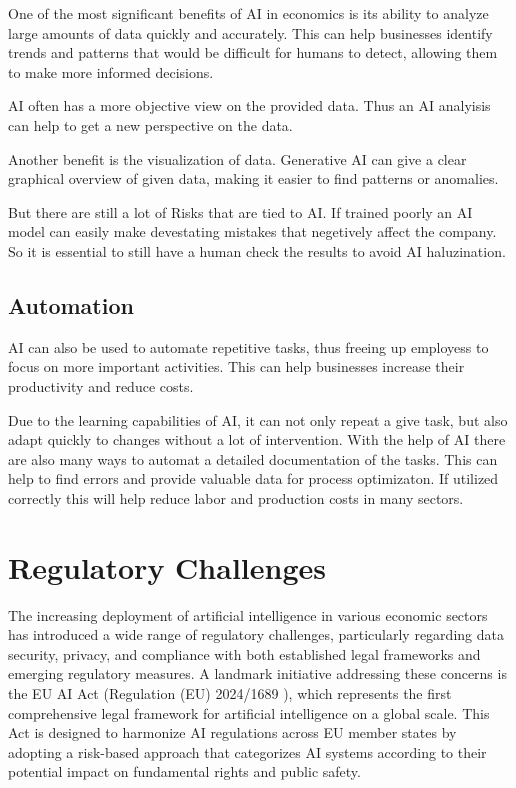 One of the most significant benefits of AI in economics is its ability to analyze large amounts of data quickly and accurately. 
This can help businesses identify trends and patterns that would be difficult for humans to detect, allowing them to make more informed decisions.

AI often has a more objective view on the provided data. Thus an AI analyisis can help to get a new perspective on the data. 

Another benefit is the visualization of data. Generative AI can give a clear graphical overview of given data, making it easier to find patterns or anomalies. 

But there are still a lot of Risks that are tied to AI.
If trained poorly an AI model can easily make devestating mistakes that negetively affect the company.
So it is essential to still have a human check the results to avoid AI haluzination.

\cite{AiDataAnalysis}

\subsection{Automation}

AI can also be used to automate repetitive tasks, thus freeing up employess to focus on more important activities.
This can help businesses increase their productivity and reduce costs.

Due to the learning capabilities of AI, it can not only repeat a give task, but also adapt quickly to changes without a lot of intervention.
With the help of AI there are also many ways to automat a detailed documentation of the tasks. This can help to find errors and provide valuable data for process optimizaton. 
If utilized correctly this will help reduce labor and production costs in many sectors. 

\cite{AiAutomation}
\cite{AIAutomation2}

\section{Regulatory Challenges}
\label{sec:regulatory-challanges}

The increasing deployment of artificial intelligence in various economic sectors has introduced a wide range of regulatory challenges, particularly regarding data security, privacy, and compliance with both established legal frameworks and emerging regulatory measures. A landmark initiative addressing these concerns is the EU AI Act (Regulation (EU) 2024/1689 \cite{EU-AI-Act-text}), which represents the first comprehensive legal framework for artificial intelligence on a global scale. This Act is designed to harmonize AI regulations across EU member states by adopting a risk-based approach that categorizes AI systems according to their potential impact on fundamental rights and public safety.

